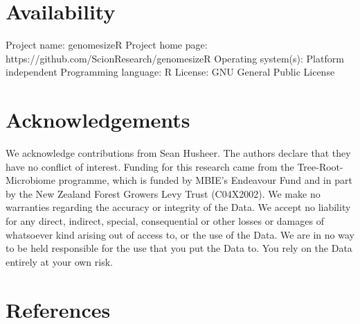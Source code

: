 \documentclass[
]{article}
\begin{document}
\section{Availability}\label{availability}

Project name: genomesizeR Project home page:
https://github.com/ScionResearch/genomesizeR Operating system(s):
Platform independent Programming language: R License: GNU General Public
License

\section{Acknowledgements}\label{acknowledgements}

We acknowledge contributions from Sean Husheer. The authors declare that
they have no conflict of interest. Funding for this research came from
the Tree-Root-Microbiome programme, which is funded by MBIE's Endeavour
Fund and in part by the New Zealand Forest Growers Levy Trust
(C04X2002). We make no warranties regarding the accuracy or integrity of
the Data. We accept no liability for any direct, indirect, special,
consequential or other losses or damages of whatsoever kind arising out
of access to, or the use of the Data. We are in no way to be held
responsible for the use that you put the Data to. You rely on the Data
entirely at your own risk.

\section*{References}\label{references}
\end{document}
